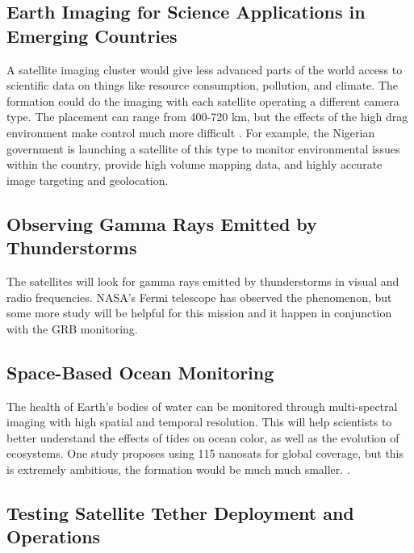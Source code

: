 \subsection{Earth Imaging for Science Applications in Emerging Countries}

A satellite imaging cluster would give less advanced parts of the world access to scientific data on things like resource consumption, pollution, and climate. The formation could do the imaging with each satellite operating a different camera type. The placement can range from 400-720 km, but the effects of the high drag environment make control much more difficult\cite{Ref:Harrison} \cite{Ref:Atir} \cite{Ref:Herscovitz}\cite{Ref:Kalman}\cite{Ref:Kim}. For example, the Nigerian government is launching a satellite of this type to monitor environmental issues within the country, provide high volume mapping data, and highly accurate image targeting and geolocation\cite{Ref:Curiel}. 

\subsection{Observing Gamma Rays Emitted by Thunderstorms}

The satellites will look for gamma rays emitted by thunderstorms in visual and radio frequencies. NASA's Fermi telescope has observed the phenomenon, but some more study will be helpful for this mission and it happen in conjunction with the GRB monitoring.\cite{Ref:Fermi} \cite{Ref:Kitts}

\subsection{Space-Based Ocean Monitoring}

The health of Earth's bodies of water can be monitored through multi-spectral imaging with high spatial and temporal resolution. This will help scientists to better understand the effects of tides on ocean color, as well as the evolution of ecosystems. One study proposes using 115 nanosats for global coverage, but this is extremely ambitious, the formation would be much much smaller. \cite{Ref:Lowe}. %

\subsection{Testing Satellite Tether Deployment and Operations}


